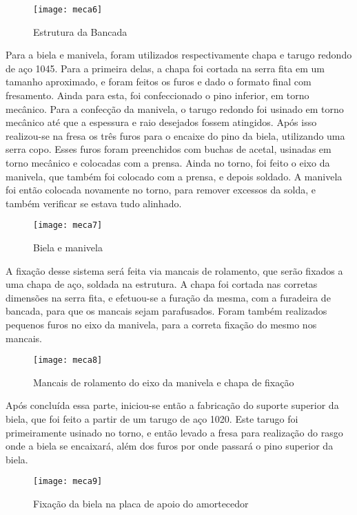 	\newpage
	\begin{figure}[!htpb]
		\centering
		\texttt{[image: meca6]}
		\caption{Estrutura da Bancada}
		\label{meca6}
	\end{figure}

	
	Para a biela e manivela, foram utilizados respectivamente chapa e tarugo redondo de aço 1045. Para a primeira delas, a chapa foi cortada na serra fita em um tamanho aproximado, e foram feitos os furos e dado o formato final com fresamento. Ainda para esta, foi confeccionado o pino inferior, em torno mecânico. Para a confecção da manivela, o tarugo redondo foi usinado em torno mecânico até que a espessura e raio desejados fossem atingidos. Após isso realizou-se na fresa os três furos para o encaixe do pino da biela, utilizando uma serra copo. Esses furos foram preenchidos com buchas de acetal, usinadas em torno mecânico e colocadas com a prensa. Ainda no torno, foi feito o eixo da manivela, que também foi colocado com a prensa, e depois soldado. A manivela foi então colocada novamente no torno, para remover excessos da solda, e também verificar se estava tudo alinhado.

	\newpage
	\begin{figure}[!htpb]
		\centering
		\texttt{[image: meca7]}
		\caption{Biela e manivela}
		\label{meca7}
	\end{figure}
	
	A fixação desse sistema será feita via mancais de rolamento, que serão fixados a uma chapa de aço, soldada na estrutura. A chapa foi cortada nas corretas dimensões na serra fita, e efetuou-se a furação da mesma, com a furadeira de bancada, para que os mancais sejam parafusados. Foram também realizados pequenos furos no eixo da manivela, para a correta fixação do mesmo nos mancais.

	\begin{figure}[!htpb]
		\centering
		\texttt{[image: meca8]}
		\caption{Mancais de rolamento do eixo da manivela e chapa de fixação}
		\label{meca8}
	\end{figure}

	\newpage
	Após concluída essa parte, iniciou-se então a fabricação do suporte superior da biela, que foi feito a partir de um tarugo de aço 1020. Este tarugo foi primeiramente usinado no torno, e então levado a fresa para realização do rasgo onde a biela se encaixará, além dos furos por onde passará o pino superior da biela. 

	\begin{figure}[!htpb]
		\centering
		\texttt{[image: meca9]}
		\caption{Fixação da biela na placa de apoio do amortecedor}
		\label{meca9}
	\end{figure}

